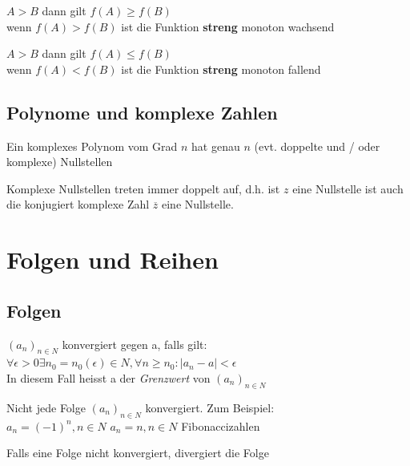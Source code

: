 \documentclass[a4paper]{article}
\begin{document}
	\begin{multicols}{2}
	\begin{fdef}
		$A > B$ dann gilt $f(A) \geq f(B)$\\
		wenn $f(A) > f(B)$ ist die Funktion \textbf{streng} monoton
		wachsend
	\end{fdef}

	\begin{fdef}
		$A > B$ dann gilt $f(A) \leq f(B)$\\
		wenn $f(A) < f(B)$ ist die Funktion \textbf{streng} monoton
		fallend
	\end{fdef}
	\end{multicols}

	
	\subsection{Polynome und komplexe Zahlen}
		\vspace{-4mm}

		\begin{fsatz}
				Ein komplexes Polynom vom Grad $n$ hat genau $n$ (evt. doppelte und / oder komplexe) Nullstellen
		\end{fsatz}
		\vspace{-4mm}
		\begin{fmerke}
				Komplexe Nullstellen treten immer doppelt auf, d.h. ist $z$ eine Nullstelle ist auch die konjugiert komplexe Zahl $\overline{z}$ eine Nullstelle.
		\end{fmerke}
		

\section{Folgen und Reihen}
\subsection{Folgen}
	\begin{fdef}[Konvergenz]
		$(a_n)_{n \in N}$ konvergiert gegen a, falls gilt: $\forall \epsilon > 0 \exists n_0=n_0(\epsilon)\in N,\forall n\geq n_0: \vert a_n - a\vert <
		\epsilon$\\
		In diesem Fall heisst a der \textit{Grenzwert} von $(a_n)_{n\in N}$
	\end{fdef}
\begin{multicols}{2}
	Nicht jede Folge $(a_n)_{n\in N}$ konvergiert. Zum Beispiel:\\
	$a_n= (-1)^n, n\in N$ \quad $a_n= n, n\in N$ \quad
	Fibonaccizahlen

	\begin{fdef}[Divergenz]
		Falls eine Folge nicht konvergiert, divergiert die Folge
	\end{fdef}
\end{multicols}
\end{document}
